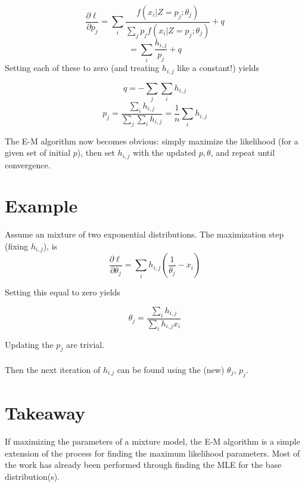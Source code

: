 \documentclass{article}
\begin{document}
\[\frac{\partial \ell}{\partial p_j}=\sum_i \frac{f(x_i|Z=p_j; \theta_j)}{\sum_j p_j f(x_i|Z=p_j; \theta_j)}+q \]
\[=\sum_i \frac{h_{i,j}}{p_j}+q \]
Setting each of these to zero (and treating \(h_{i,j}\) like a constant!) yields

\[q=-\sum_j \sum_i h_{i,j}\]
\[p_j=\frac{\sum_i h_{i, j}}{\sum_j \sum_i h_{i, j}}=\frac{1}{n}\sum_i h_{i,j}\]

The E-M algorithm now becomes obvious: simply maximize the likelihood (for a given set of initial \(p\)), then set \(h_{i,j}\) with the updated \(p,\theta\), and repeat until convergence.

\section{Example}

Assume an mixture of two exponential distributions.  The maximization step (fixing \(h_{i,j}\)), is 
\[\frac{\partial \ell}{\partial \theta_j}=\sum_i h_{i,j} \left(\frac{1}{\theta_j}-x_i\right)\]

Setting this equal to zero yields 

\[\theta_j=\frac{\sum_i h_{i,j}}{\sum_i h_{i,j} x_i}\]

Updating the \(p_j\) are trivial.
\\
\\
Then the next iteration of \(h_{i.j}\) can be found using the (new) \(\theta_j\), \(p_j\).

\section{Takeaway}

If maximizing the parameters of a mixture model, the E-M algorithm is a simple extension of the process for finding the maximum likelihood parameters.  Most of the work has already been performed through finding the MLE for the base distribution(s).  
\end{document}
